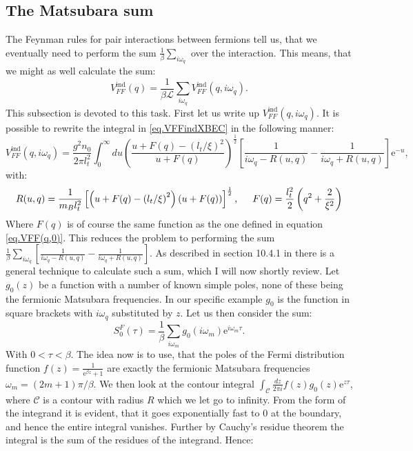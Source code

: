 \subsection{The Matsubara sum}
The Feynman rules for pair interactions between fermions tell us, that we eventually need to perform the sum $\frac{1}{\beta}\sum_{i\omega_q}$ over the interaction. This means, that we might as well calculate the sum:
\begin{equation}
V^\text{ind}_{FF}(q) = \frac{1}{\beta\mathcal{L}}\sum_{i\omega_q} V^\text{ind}_{FF}(q,i\omega_q).
\label{eq.VFFqdef}
\end{equation}  
This subsection is devoted to this task. First let us write up $V^\text{ind}_{FF}(q,i\omega_q)$. It is possible to rewrite the integral in \eqref{eq.VFFindXBEC} in the following manner:
\begin{equation}
V^\text{ind}_{FF}(q,i\omega_q) = \frac{g^2n_0}{2\pi l_t^2}\int_0^\infty du \left(\frac{u+F(q)-\left(l_t/\xi\right)^2}{u+F(q)}\right)^{\frac{1}{2}}\left[\frac{1}{i\omega_q-R(u,q)}-\frac{1}{i\omega_q+R(u,q)}\right]\text{e}^{-u},
\label{eq.VFFindomega}
\end{equation}
with: 
\begin{equation}
R(u,q) = \frac{1}{m_B l_t^2}\left[\left(u+F(q)-\left(l_t/\xi\right)^2\right)\left(u+F(q)\right)\right]^{\frac{1}{2}}, \hspace{0.5cm} F(q) = \frac{l_t^2}{2}\left(q^2+\frac{2}{\xi^2} \right)
\label{eq.Ruq}
\end{equation}
Where $F(q)$ is of course the same function as the one defined in equation \eqref{eq.VFF(q,0)}. This reduces the problem to performing the sum $\frac{1}{\beta}\sum_{i\omega_q}\left[\frac{1}{i\omega_q-R(u,q)}-\frac{1}{i\omega_q+R(u,q)}\right]$. As described in section 10.4.1 in \cite{BruusFlensberg} there is a general technique to calculate such a sum, which I will now shortly review. Let $g_0(z)$ be a function with a number of known simple poles, none of these being the fermionic Matsubara frequencies. In our specific example $g_0$ is the function in square brackets with $i\omega_q$ substituted by $z$. Let us then consider the sum:
\begin{equation}
S^F_0(\tau) = \frac{1}{\beta}\sum_{i\omega_m}g_0(i\omega_m)\text{e}^{i\omega_m\tau}. \nonumber
\end{equation}
With $0<\tau<\beta$. The idea now is to use, that the poles of the Fermi distribution function $f(z) = \frac{1}{\text{e}^{\beta z}+1}$ are exactly the fermionic Matsubara frequencies $\omega_m = (2m+1)\pi /\beta$. We then look at the contour integral $ \int_\mathcal{C} \frac{dz}{2\pi i} f(z)g_0(z)\text{e}^{z\tau}$, where $\mathcal{C}$ is a contour with radius $R$ which we let go to infinity. From the form of the integrand it is evident, that it goes exponentially fast to 0 at the boundary, and hence the entire integral vanishes. Further by Cauchy's residue theorem the integral is the sum of the residues of the integrand. Hence:
